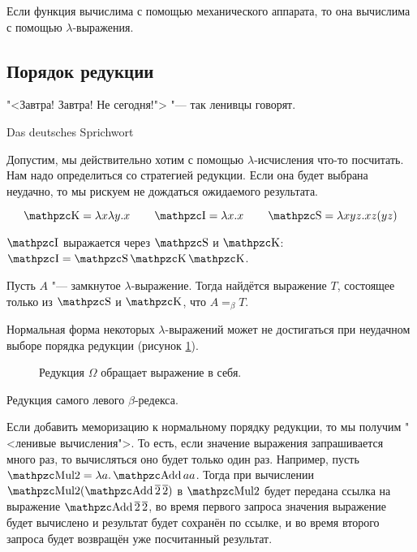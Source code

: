 \begin{theorem}
    Если функция вычислима с помощью механического аппарата, то она вычислима с помощью $\lambda$-выражения.
\end{theorem}

\subsection{\texorpdfstring{Порядок редукции}{Order of reduction}}
\epigraph{"<Завтра! Завтра! Не сегодня!"> "--- так ленивцы говорят.}{Das deutsches Sprichwort}

Допустим, мы действительно хотим с помощью $\lambda$-исчисления что-то посчитать.
Нам надо определиться со стратегией редукции. Если она будет выбрана неудачно, то мы рискуем не дождаться ожидаемого результата.

\begin{definition}
\[
    \comb K = \lambda x \lambda y . x \qquad
    \comb I = \lambda x . x \qquad
    \comb S = \lambda x y z . x z (y z)
\]
\end{definition}
$\comb I$ выражается через $\comb S$ и $\comb K$: $\comb I = \comb S \comb K \comb K$.

\begin{statement} \label{SK-basis}
    Пусть $A$ "--- замкнутое $\lambda$-выражение.
    Тогда найдётся выражение $T$, состоящее только из $\comb S$ и $\comb K$, что $A =_{\beta}T$.
\end{statement}

Нормальная форма некоторых $\lambda$-выражений может не достигаться при неудачном выборе порядка редукции (рисунок \ref{infred}).
\begin{figure}[ht]
\centering
{}
\caption{Редукция $\Omega$ обращает выражение в себя.}
\label{infred}
\end{figure}

\begin{definition}
    Редукция самого левого $\beta$-редекса.
\end{definition}
Если добавить меморизацию к нормальному порядку редукции, то мы получим "<ленивые вычисления">.
То есть, если значение выражения запрашивается много раз, то вычисляться оно будет только один раз.
Например, пусть $\comb{Mul2} = \lambda a . \comb{Add} a a$.
Тогда при вычислении $\comb{Mul2} (\comb{Add} \mathinner{\overline 2} \overline 2)$ в $\comb{Mul2}$ будет передана ссылка
на выражение $\comb{Add} \mathinner{\overline 2} \overline 2$,
во время первого запроса значения выражение будет вычислено и результат будет сохранён по ссылке,
и во время второго запроса будет возвращён уже посчитанный результат.

